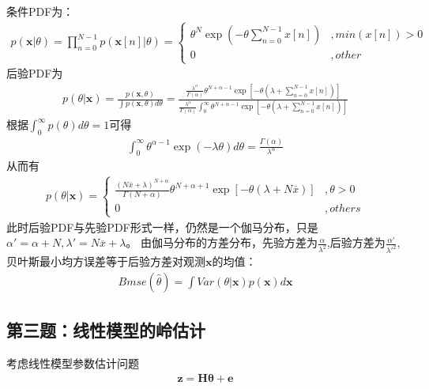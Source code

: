 \documentclass[fontset=windows]{article}
\numberwithin{figure}{section}
\begin{document}
条件PDF为：
\begin{align*}
	p(\mathbf{x}|\theta)=\prod_{n=0}^{N-1}p(\mathbf{x}[n]|\theta)=
	\left\{
	\begin{matrix}
		\theta^N\exp(-\theta \sum_{n=0}^{N-1} x[n]) & ,min(x[n])>0 \\
		0                                           & ,other
	\end{matrix}
	\right.
\end{align*}
后验PDF为
\begin{align*}
	p(\theta|\mathbf{x})=\frac{p(\mathbf{x},\theta)}{\int p(\mathbf{x},\theta)d\theta}
	=\frac{\frac{\lambda ^\alpha}{\Gamma(\alpha)}\theta^{N+\alpha-1}
		\exp\left[-\theta (\lambda+\sum_{n=0}^{N-1}x[n])\right]}
	{\frac{\lambda ^\alpha}{\Gamma(\alpha)}\int_0^{\infty}\theta^{N+\alpha-1}
		\exp \left[ -\theta (\lambda+\sum_{n=0}^{N-1}x[n]) \right]}
\end{align*}
根据\(\int_0^{\infty}p(\theta)d\theta=1\)可得
\begin{align*}
	\int_{0}^{\infty} \theta^{\alpha-1}\exp (-\lambda \theta)d\theta=
	\frac{\Gamma(\alpha)}{\lambda^{\alpha}}
\end{align*}
从而有
\begin{align*}
	p(\theta|\mathbf{x})=\left\{
	\begin{matrix}
		\frac{(N\overline{x}+\lambda)^{N+\alpha}}{\Gamma(N+\alpha)}
		\theta^{N+\alpha+1}\exp \left[ -\theta (\lambda+N \overline{x})\right] & ,\theta>0 \\
		0                                                                      & ,others
	\end{matrix}
	\right.
\end{align*}
此时后验PDF与先验PDF形式一样，仍然是一个伽马分布，只是\(\alpha'=\alpha+N,\lambda'=N\overline{x}+\lambda\)。
由伽马分布的方差分布，先验方差为\(\frac{\alpha}{\lambda^2}\),后验方差为\(\frac{\alpha'}{\lambda'^2}\),
贝叶斯最小均方误差等于后验方差对观测\(\mathbf{x}\)的均值：
\begin{align*}
	Bmse(\hat{\theta})=\int Var(\theta|\mathbf{x})p(\mathbf{x})d\mathbf{x}
\end{align*}

\subsection{第三题：线性模型的岭估计}
考虑线性模型参数估计问题
\begin{align*}
	\mathbf{z}=\mathbf{H}\boldsymbol{\theta}+\mathbf{e}
\end{align*}
\end{document}
